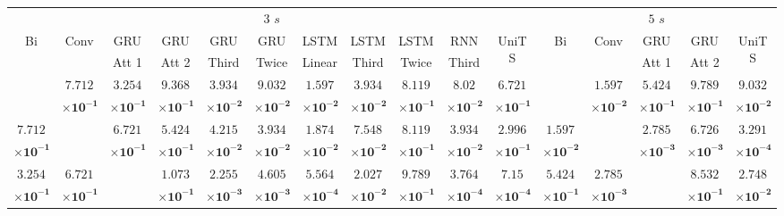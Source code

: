 \begin{table}[!ht]
{\begin{tabular}{|c|c|c|c|c|c|c|c|c|c|c|c|c|c|c|c|}
			\multicolumn{11}{c}{$3$ $s$} & \multicolumn{5}{c}{$5$ $s$} \\ \cline{1-16}
			\multirow{2}{*}{Bi} & \multirow{2}{*}{Conv} & GRU & GRU & GRU & GRU & LSTM & LSTM & LSTM & RNN & \multirow{2}{*}{UniTS} & \multirow{2}{*}{Bi} & \multirow{2}{*}{Conv} & GRU & GRU & \multirow{2}{*}{UniTS} \\ 
			 & & Att 1 & Att 2 & Third & Twice & Linear & Third & Twice & Third & & & & Att 1 & Att 2 & \\ \cline{1-16}
			\multirow{2}{*}{} & $\mathbf{7.712}$ & $\mathbf{3.254}$ & $\mathbf{9.368}$ & $\mathbf{3.934}$ & $\mathbf{9.032}$ & $\mathbf{1.597}$ & $\mathbf{3.934}$ & $\mathbf{8.119}$ & $\mathbf{8.02}$ & $\mathbf{6.721}$ & \multirow{2}{*}{} & $\mathbf{1.597}$ & $\mathbf{5.424}$ & $\mathbf{9.789}$ & $\mathbf{9.032}$\\ 
			 & $\mathbf{\times 10^{-1}}$ & $\mathbf{\times 10^{-1}}$ & $\mathbf{\times 10^{-1}}$ & $\mathbf{\times 10^{-2}}$ & $\mathbf{\times 10^{-2}}$ & $\mathbf{\times 10^{-2}}$ & $\mathbf{\times 10^{-2}}$ & $\mathbf{\times 10^{-1}}$ & $\mathbf{\times 10^{-2}}$ & $\mathbf{\times 10^{-1}}$ & & $\mathbf{\times 10^{-2}}$ & $\mathbf{\times 10^{-1}}$ & $\mathbf{\times 10^{-1}}$ & $\mathbf{\times 10^{-2}}$\\ \cline{1-16}
			$\mathbf{7.712}$ & \multirow{2}{*}{} & $\mathbf{6.721}$ & $\mathbf{5.424}$ & $\mathbf{4.215}$ & $\mathbf{3.934}$ & $\mathbf{1.874}$ & $\mathbf{7.548}$ & $\mathbf{8.119}$ & $\mathbf{3.934}$ & $\mathbf{2.996}$ & $\mathbf{1.597}$ & \multirow{2}{*}{} & $\mathbf{2.785}$ & $\mathbf{6.726}$ & $\mathbf{3.291}$\\ 
			$\mathbf{\times 10^{-1}}$ & & $\mathbf{\times 10^{-1}}$ & $\mathbf{\times 10^{-1}}$ & $\mathbf{\times 10^{-2}}$ & $\mathbf{\times 10^{-2}}$ & $\mathbf{\times 10^{-2}}$ & $\mathbf{\times 10^{-2}}$ & $\mathbf{\times 10^{-1}}$ & $\mathbf{\times 10^{-2}}$ & $\mathbf{\times 10^{-1}}$ & $\mathbf{\times 10^{-2}}$ & & $\mathbf{\times 10^{-3}}$ & $\mathbf{\times 10^{-3}}$ & $\mathbf{\times 10^{-4}}$\\ \cline{1-16}
			$\mathbf{3.254}$ & $\mathbf{6.721}$ & \multirow{2}{*}{} & $\mathbf{1.073}$ & $\mathbf{2.255}$ & $\mathbf{4.605}$ & $\mathbf{5.564}$ & $\mathbf{2.027}$ & $\mathbf{9.789}$ & $\mathbf{3.764}$ & $\mathbf{7.15}$ & $\mathbf{5.424}$ & $\mathbf{2.785}$ & \multirow{2}{*}{} & $\mathbf{8.532}$ & $\mathbf{2.748}$\\ 
			$\mathbf{\times 10^{-1}}$ & $\mathbf{\times 10^{-1}}$ & & $\mathbf{\times 10^{-1}}$ & $\mathbf{\times 10^{-3}}$ & $\mathbf{\times 10^{-3}}$ & $\mathbf{\times 10^{-4}}$ & $\mathbf{\times 10^{-2}}$ & $\mathbf{\times 10^{-1}}$ & $\mathbf{\times 10^{-4}}$ & $\mathbf{\times 10^{-4}}$ & $\mathbf{\times 10^{-1}}$ & $\mathbf{\times 10^{-3}}$ & & $\mathbf{\times 10^{-1}}$ & $\mathbf{\times 10^{-2}}$\\ \cline{1-16}

\end{tabular}}
\end{table}
